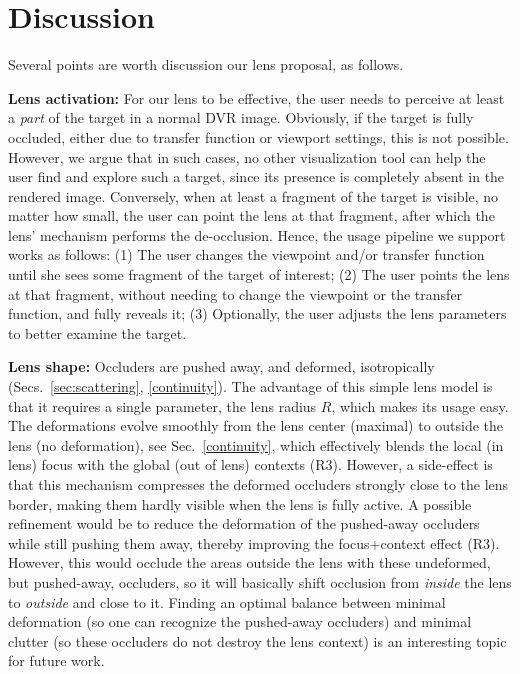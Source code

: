 \section{Discussion}
\label{sec:discussion}
%
%
Several points are worth discussion our lens proposal, as follows.

\vspace{0.15cm}
\noindent\textbf{Lens activation:} For our lens to be effective, the user needs to perceive at least a \emph{part} of the target in a normal DVR image. Obviously, if the target is fully occluded, either due to transfer function or viewport settings, this is not possible. However, we argue that in such cases, no other visualization tool can help the user find and explore such a target, since its presence is completely absent in the rendered image. Conversely, when at least a fragment of the target is visible, no matter how small, the user can point the lens at that fragment, after which the lens' mechanism performs the de-occlusion. Hence, the usage pipeline we support works as follows: (1) The user changes the viewpoint and/or transfer function until she sees some fragment of the target of interest; (2) The user points the lens at that fragment, without needing to change the viewpoint or the transfer function, and fully reveals it; (3) Optionally, the user adjusts the lens parameters to better examine the target.


\vspace{0.15cm}
\noindent\textbf{Lens shape:} Occluders are pushed away, and deformed, isotropically (Secs.~\ref{sec:scattering}, \ref{continuity}). The advantage of this simple lens model is that it requires a single parameter, the lens radius $R$, which makes its usage easy. The deformations evolve smoothly from the lens center (maximal) to outside the lens (no deformation), see Sec.~\ref{continuity}, which effectively blends the local (in lens) focus with the global (out of lens) contexts (R3). However, a side-effect is that this mechanism compresses the deformed occluders strongly close to the lens border, making them hardly visible when the lens is fully active. A possible refinement would be to reduce the deformation of the pushed-away occluders while still pushing them away, thereby improving the focus+context effect (R3). However, this would occlude the areas outside the lens with these undeformed, but pushed-away, occluders, so it will basically shift occlusion from \emph{inside} the lens to \emph{outside} and close to it. Finding an optimal balance between minimal deformation (so one can recognize the pushed-away occluders) and minimal clutter (so these occluders do not destroy the lens context) is an interesting topic for future work.

